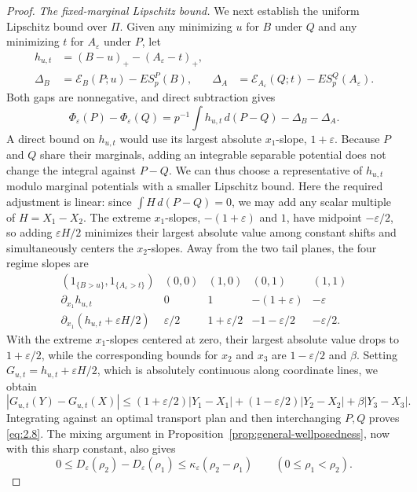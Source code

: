 \begin{proof}
\emph{The fixed-marginal Lipschitz bound.} We next establish the uniform Lipschitz bound over \(\Pi\). Given any minimizing \(u\) for \(B\) under \(Q\) and any minimizing \(t\) for \(A_\varepsilon\) under \(P\), let
\[
\begin{aligned}
h_{u,t}&=(B-u)_+-(A_\varepsilon-t)_+,\\
\Delta_B&=\mathscr E_B(P;u)-ES_p^P(B),&
\Delta_A&=\mathscr E_{A_\varepsilon}(Q;t)-ES_p^Q(A_\varepsilon).
\end{aligned}
\]
Both gaps are nonnegative, and direct subtraction gives
\begin{equation}
\Phi_\varepsilon(P)-\Phi_\varepsilon(Q)
=p^{-1}\int h_{u,t}\,d(P-Q)-\Delta_B-\Delta_A.
\tag{2.11}\label{eq:2.11}
\end{equation}
A direct bound on \(h_{u,t}\) would use its largest absolute \(x_1\)-slope, \(1+\varepsilon\). Because \(P\) and \(Q\) share their marginals, adding an integrable separable potential does not change the integral against \(P-Q\). We can thus choose a representative of \(h_{u,t}\) modulo marginal potentials with a smaller Lipschitz bound. Here the required adjustment is linear: since \(\int H\,d(P-Q)=0\), we may add any scalar multiple of \(H=X_1-X_2\). The extreme \(x_1\)-slopes, \(-(1+\varepsilon)\) and \(1\), have midpoint \(-\varepsilon/2\), so adding \(\varepsilon H/2\) minimizes their largest absolute value among constant shifts and simultaneously centers the \(x_2\)-slopes. Away from the two tail planes, the four regime slopes are
\[
\begin{array}{c|rrrr}
(1_{\{B>u\}},1_{\{A_\varepsilon>t\}})&(0,0)&(1,0)&(0,1)&(1,1)\\
\partial_{x_1}h_{u,t}&0&1&-(1+\varepsilon)&-\varepsilon\\
\partial_{x_1}(h_{u,t}+\varepsilon H/2)&\varepsilon/2&1+\varepsilon/2&-1-\varepsilon/2&-\varepsilon/2.
\end{array}
\]
With the extreme \(x_1\)-slopes centered at zero, their largest absolute value drops to \(1+\varepsilon/2\), while the corresponding bounds for \(x_2\) and \(x_3\) are \(1-\varepsilon/2\) and \(\beta\). Setting \(G_{u,t}=h_{u,t}+\varepsilon H/2\), which is absolutely continuous along coordinate lines, we obtain
\[
|G_{u,t}(Y)-G_{u,t}(X)|
\le(1+\varepsilon/2)|Y_1-X_1|
+(1-\varepsilon/2)|Y_2-X_2|+\beta|Y_3-X_3|.
\]
Integrating against an optimal transport plan and then interchanging \(P,Q\) proves \eqref{eq:2.8}. The mixing argument in Proposition~\ref{prop:general-wellposedness}, now with this sharp constant, also gives
\begin{equation}
0\le D_\varepsilon(\rho_2)-D_\varepsilon(\rho_1)
\le \kappa_\varepsilon(\rho_2-\rho_1)\qquad(0\le\rho_1<\rho_2).
\tag{2.12}\label{eq:sharp-budget-continuity}
\end{equation}


\end{proof}
